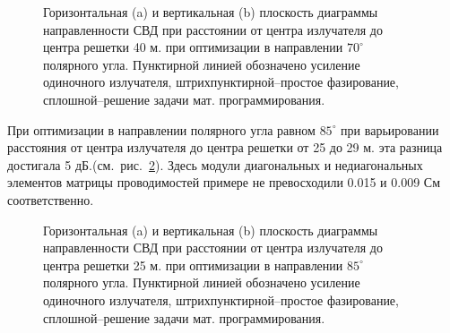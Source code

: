 \begin{figure}
\begin{minipage}[h]{0.49\linewidth}
\end{minipage}
\hfill
\begin{minipage}[h]{0.49\linewidth}
\end{minipage}
\caption{Горизонтальная (a) и вертикальная (b) плоскость диаграммы направленности СВД при расстоянии от центра излучателя до центра решетки 40 м. при оптимизации в направлении $70^{\circ}$ полярного угла. Пунктирной линией обозначено усиление одиночного излучателя, штрихпунктирной--простое фазирование, сплошной--решение задачи мат. программирования.}
\label{ris:svd_mut_5_70_40}
\end{figure}

При оптимизации в направлении полярного угла равном $85^{\circ}$ при варьировании расстояния от центра излучателя до центра решетки от 25 до 29 м. эта разница достигала 5 дБ.(см.~рис.~\ref{ris:svd_mut_5_85_25}). Здесь модули диагональных и недиагональных элементов матрицы проводимостей примере не превосходили 0.015 и 0.009 См соответственно.

\begin{figure}
\begin{minipage}[h]{0.49\linewidth}
\end{minipage}
\hfill
\begin{minipage}[h]{0.49\linewidth}
\end{minipage}
\caption{Горизонтальная (a) и вертикальная (b) плоскость диаграммы направленности СВД при расстоянии от центра излучателя до центра решетки 25 м. при оптимизации в направлении $85^{\circ}$ полярного угла. Пунктирной линией обозначено усиление одиночного излучателя, штрихпунктирной--простое фазирование, сплошной--решение задачи мат. программирования.}
\label{ris:svd_mut_5_85_25}
\end{figure}

